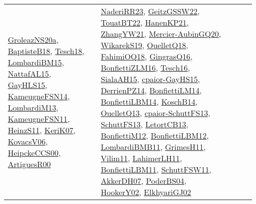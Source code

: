 {\begin{longtable}{lp{3cm}>{\raggedright}p{6cm}>{\raggedright}p{6cm}p{8cm}}
\href{papers/GroleazNS20a.pdf}{GroleazNS20a}\cite{GroleazNS20a}, \href{articles/BaptisteB18.pdf}{BaptisteB18}\cite{BaptisteB18}, \href{papers/Tesch18.pdf}{Tesch18}\cite{Tesch18}, \href{papers/LombardiBM15.pdf}{LombardiBM15}\cite{LombardiBM15}, \href{articles/NattafAL15.pdf}{NattafAL15}\cite{NattafAL15}, \href{papers/GayHLS15.pdf}{GayHLS15}\cite{GayHLS15}, \href{articles/KameugneFSN14.pdf}{KameugneFSN14}\cite{KameugneFSN14}, \href{papers/LombardiM13.pdf}{LombardiM13}\cite{LombardiM13}, \href{papers/KameugneFSN11.pdf}{KameugneFSN11}\cite{KameugneFSN11}, \href{papers/HeinzS11.pdf}{HeinzS11}\cite{HeinzS11}, \href{papers/KeriK07.pdf}{KeriK07}\cite{KeriK07}, \href{papers/KovacsV06.pdf}{KovacsV06}\cite{KovacsV06}, \href{articles/HeipckeCCS00.pdf}{HeipckeCCS00}\cite{HeipckeCCS00}, \href{articles/ArtiguesR00.pdf}{ArtiguesR00}\cite{ArtiguesR00} & \href{articles/NaderiRR23.pdf}{NaderiRR23}\cite{NaderiRR23}, \href{papers/GeitzGSSW22.pdf}{GeitzGSSW22}\cite{GeitzGSSW22}, \href{papers/TouatBT22.pdf}{TouatBT22}\cite{TouatBT22}, \href{papers/HanenKP21.pdf}{HanenKP21}\cite{HanenKP21}, \href{articles/ZhangYW21.pdf}{ZhangYW21}\cite{ZhangYW21}, \href{papers/Mercier-AubinGQ20.pdf}{Mercier-AubinGQ20}\cite{Mercier-AubinGQ20}, \href{articles/WikarekS19.pdf}{WikarekS19}\cite{WikarekS19}, \href{papers/OuelletQ18.pdf}{OuelletQ18}\cite{OuelletQ18}, \href{articles/FahimiOQ18.pdf}{FahimiOQ18}\cite{FahimiOQ18}, \href{papers/GingrasQ16.pdf}{GingrasQ16}\cite{GingrasQ16}, \href{papers/BonfiettiZLM16.pdf}{BonfiettiZLM16}\cite{BonfiettiZLM16}, \href{papers/Tesch16.pdf}{Tesch16}\cite{Tesch16}, \href{papers/SialaAH15.pdf}{SialaAH15}\cite{SialaAH15}, \href{papers/cpaior-GayHS15.pdf}{cpaior-GayHS15}\cite{cpaior-GayHS15}, \href{papers/DerrienPZ14.pdf}{DerrienPZ14}\cite{DerrienPZ14}, \href{papers/BonfiettiLM14.pdf}{BonfiettiLM14}\cite{BonfiettiLM14}, \href{articles/BonfiettiLBM14.pdf}{BonfiettiLBM14}\cite{BonfiettiLBM14}, \href{papers/KoschB14.pdf}{KoschB14}\cite{KoschB14}, \href{papers/OuelletQ13.pdf}{OuelletQ13}\cite{OuelletQ13}, \href{papers/cpaior-SchuttFS13.pdf}{cpaior-SchuttFS13}\cite{cpaior-SchuttFS13}, \href{papers/SchuttFS13.pdf}{SchuttFS13}\cite{SchuttFS13}, \href{papers/LetortCB13.pdf}{LetortCB13}\cite{LetortCB13}, \href{papers/BonfiettiM12.pdf}{BonfiettiM12}\cite{BonfiettiM12}, \href{papers/BonfiettiLBM12.pdf}{BonfiettiLBM12}\cite{BonfiettiLBM12}, \href{papers/LombardiBMB11.pdf}{LombardiBMB11}\cite{LombardiBMB11}, \href{papers/GrimesH11.pdf}{GrimesH11}\cite{GrimesH11}, \href{papers/Vilim11.pdf}{Vilim11}\cite{Vilim11}, \href{papers/LahimerLH11.pdf}{LahimerLH11}\cite{LahimerLH11}, \href{papers/BonfiettiLBM11.pdf}{BonfiettiLBM11}\cite{BonfiettiLBM11}, \href{articles/SchuttFSW11.pdf}{SchuttFSW11}\cite{SchuttFSW11}, \href{papers/AkkerDH07.pdf}{AkkerDH07}\cite{AkkerDH07}, \href{articles/PoderBS04.pdf}{PoderBS04}\cite{PoderBS04}, \href{papers/HookerY02.pdf}{HookerY02}\cite{HookerY02}, \href{papers/ElkhyariGJ02.pdf}{ElkhyariGJ02}\cite{ElkhyariGJ02}\\

\end{longtable}}

